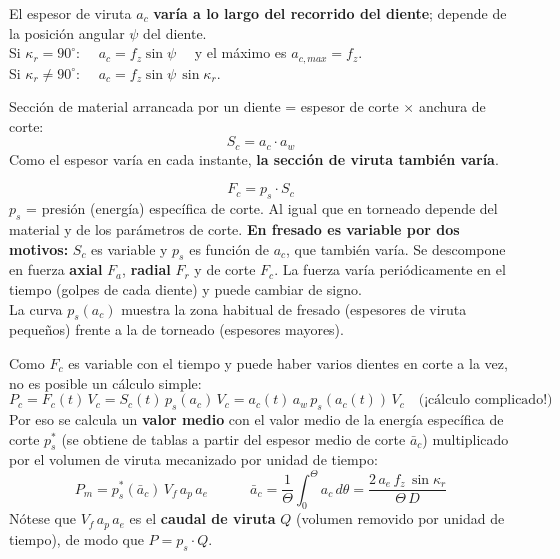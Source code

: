 \documentclass[12pt,a4paper]{article}
\begin{document}
\begin{formu}
	El espesor de viruta $a_c$ \textbf{varía a lo largo del recorrido del diente};
	depende de la posición angular $\psi$ del diente.\\[3pt]
	Si $\kappa_r = 90^\circ$: $\quad a_c = f_z \sin\psi \quad$ y el máximo es
	$a_{c,max} = f_z$.\\[3pt]
	Si $\kappa_r \neq 90^\circ$: $\quad a_c = f_z \sin\psi\,\sin\kappa_r$.
\end{formu}

\begin{formu}
	Sección de material arrancada por un diente = espesor de corte $\times$
	anchura de corte:
	\[ S_c = a_c \cdot a_w \]
	Como el espesor varía en cada instante, \textbf{la sección de viruta también
		varía}.
\end{formu}

\begin{formu}
	\[ F_c = p_s \cdot S_c \]
	$p_s$ = presión (energía) específica de corte. Al igual que en torneado
	depende del material y de los parámetros de corte. \textbf{En fresado es
		variable por dos motivos:} $S_c$ es variable y $p_s$ es función de $a_c$,
	que
	también varía. Se descompone en fuerza \textbf{axial} $F_a$, \textbf{radial}
	$F_r$ y de corte $F_c$. La fuerza varía periódicamente en el tiempo (golpes de
	cada diente) y puede cambiar de signo.\\
	La curva $p_s(a_c)$ muestra la zona habitual de fresado (espesores de viruta
	pequeños) frente a la de torneado (espesores mayores).
\end{formu}

\begin{formu}
	Como $F_c$ es variable con el tiempo y puede haber varios dientes en corte a
	la vez, no es posible un cálculo simple:
	\[ P_c = F_c(t)\, V_c = S_c(t)\, p_s(a_c)\, V_c = a_c(t)\, a_w\, p_s(a_c(t))\,
		V_c \quad \text{(¡cálculo complicado!)} \]
	Por eso se calcula un \textbf{valor medio} con el valor medio de la energía
	específica de corte $p_s^*$ (se obtiene de tablas a partir del espesor medio
	de
	corte $\bar a_c$) multiplicado por el volumen de viruta mecanizado por unidad
	de
	tiempo:
	\[ P_m = p_s^*(\bar a_c)\, V_f\, a_p\, a_e \qquad\quad \bar a_c =
		\frac{1}{\Theta}\int_0^{\Theta} a_c\, d\theta = \frac{2\, a_e\, f_z\,
			\sin\kappa_r}{\Theta\, D} \]
	Nótese que $V_f\, a_p\, a_e$ es el \textbf{caudal de viruta} $Q$ (volumen
	removido por unidad de tiempo), de modo que $P = p_s\cdot Q$.
\end{formu}
\end{document}
